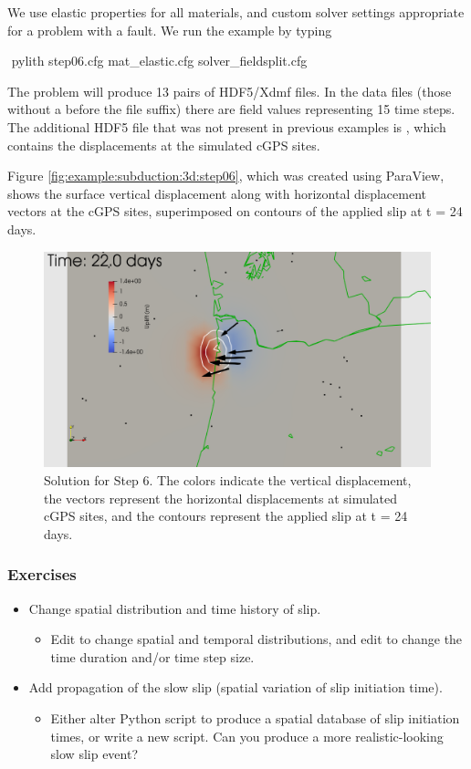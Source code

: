 We use elastic properties for all materials, and custom solver
settings appropriate for a problem with a fault. We run the example by typing
\begin{shell}
$$ pylith step06.cfg mat_elastic.cfg solver_fieldsplit.cfg
\end{shell}
The problem will produce 13 pairs of HDF5/Xdmf files. In the data
files (those without a  before the file suffix) there
are field values representing 15 time steps. The additional HDF5 file
that was not present in previous examples is
, which contains the displacements at
the simulated cGPS sites.

Figure \vref{fig:example:subduction:3d:step06}, which was created
using ParaView, shows the surface vertical displacement along with
horizontal displacement vectors at the cGPS sites, superimposed on
contours of the applied slip at t = 24 days.

\begin{figure}
  \includegraphics[width=4.5in]{examples/figs/subduction3d_step06_soln}
  \caption{Solution for Step 6. The colors indicate the vertical
    displacement, the vectors represent the horizontal displacements
    at simulated cGPS sites, and the contours represent the applied
    slip at t = 24 days. }
  \label{fig:example:subduction:3d:step06}
\end{figure}


\subsubsection{Exercises}

\begin{itemize}
\item Change spatial distribution and time history of slip.
  \begin{itemize}
  \item Edit  to change spatial and
    temporal distributions, and edit  to change the
    time duration and/or time step size.
  \end{itemize}
\item Add propagation of the slow slip (spatial variation of slip
  initiation time).
  \begin{itemize}
  \item Either alter Python script to produce a spatial database of
    slip initiation times, or write a new script. Can you produce a
    more realistic-looking slow slip event?
  \end{itemize}
\end{itemize}


